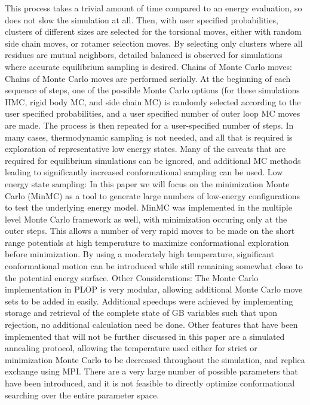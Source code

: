 This process takes a trivial amount of time compared to an energy evaluation, so does not slow the simulation at all.
Then, with user specified probabilities, clusters of different sizes are selected for the torsional moves, either with random side chain moves, or rotamer selection moves.
By selecting only clusters where all residues are mutual neighbors, detailed balanced is observed for simulations where accurate equilibrium sampling is desired.
Chains of Monte Carlo moves: Chains of Monte Carlo moves are performed serially.
At the beginning of each sequence of steps, one of the possible Monte Carlo options (for these simulations HMC, rigid body MC, and side chain MC) is randomly selected according to the user specified probabilities, and a user specified number of outer loop MC moves are made.
The process is then repeated for a user-specified number of steps.
In many cases, thermodynamic sampling is not needed, and all that is required is exploration of representative low energy states.
Many of the caveats that are required for equilibrium simulations can be ignored, and additional MC methods leading to significantly increased conformational sampling can be used.
Low energy state sampling: In this paper we will focus on the minimization Monte Carlo (MinMC) as a tool to generate large numbers of low-energy configurations to test the underlying energy model.
MinMC was implemented in the multiple level Monte Carlo framework as well, with minimization occuring only at the outer steps.
This allows a number of very rapid moves to be made on the short range potentials at high temperature to maximize conformational exploration before minimization.
By using a moderately high temperature, significant conformational motion can be introduced while still remaining somewhat close to the potential energy surface.
Other Considerations: The Monte Carlo implementation in PLOP is very modular, allowing additional Monte Carlo move sets to be added in easily.
Additional speedups were achieved by implementing storage and retrieval of the complete state of GB variables such that upon rejection, no additional calculation need be done.
Other features that have been implemented that will not be further discussed in this paper are a simulated annealing protocol, allowing the temperature used either for strict or minimization Monte Carlo to be decreased throughout the simulation, and replica exchange using MPI.
There are a very large number of possible parameters that have been introduced, and it is not feasible to directly optimize conformational searching over the entire parameter space.
